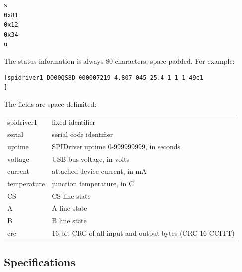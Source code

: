 \documentclass{article}
\newcommand{\gap}{\vspace{10pt}}
\begin{document}
\begin{lstlisting}
s
0x81
0x12
0x34
u
\end{lstlisting}


The status information is always 80 characters, space padded. For example:

{\scriptsize
\begin{framed}\begin{Verbatim}
[spidriver1 DO00QS8D 000007219 4.807 045 25.4 1 1 1 49c1                       ]
\end{Verbatim}
\end{framed}}

The fields are space-delimited:

\gap\begin{tabular}{ll}
\hline
spidriver1      & fixed identifier \\
serial          & serial code identifier \\
uptime          & SPIDriver uptime 0-999999999, in seconds \\
voltage         & USB bus voltage, in volts \\
current         & attached device current, in mA \\
temperature     & junction temperature, in C \\
CS              & CS line state \\
A               & A line state \\
B               & B line state \\
crc             & 16-bit CRC of all input and output bytes (CRC-16-CCITT)  \index{CRC}\\
\hline
\end{tabular}\gap

\newpage
\subsection{Specifications}\label{electrical-characteristics}
\end{document}
